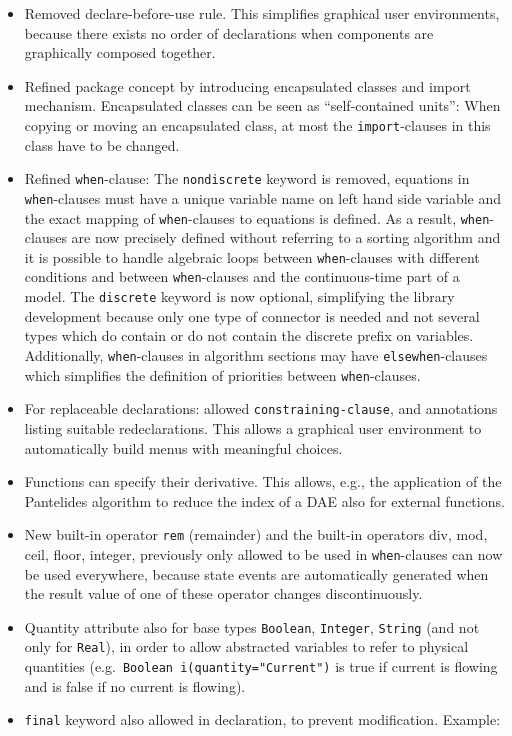\begin{itemize}
\item
  Removed declare-before-use rule. This simplifies graphical user
  environments, because there exists no order of declarations when
  components are graphically composed together.
\item
  Refined package concept by introducing encapsulated classes and import mechanism.
  Encapsulated classes can be seen as ``self-contained units'':
  When copying or moving an encapsulated class, at most the \lstinline!import!-clauses in this class have to be changed.
\item
  Refined \lstinline!when!-clause:
  The \lstinline[morekeywords={[2]{nondiscrete}}]!nondiscrete! keyword is removed, equations in \lstinline!when!-clauses must have a unique variable name on left hand side variable and the exact mapping of \lstinline!when!-clauses to equations is defined.
  As a result, \lstinline!when!-clauses are now precisely defined without referring to a sorting algorithm and it is possible to handle algebraic loops between \lstinline!when!-clauses with different conditions and between \lstinline!when!-clauses and the continuous-time part of a model.
  The \lstinline!discrete! keyword is now optional, simplifying the library development because only one type of connector is needed and not several types which do contain or do not contain the discrete prefix on variables.
  Additionally, \lstinline!when!-clauses in algorithm sections may have \lstinline!elsewhen!-clauses which simplifies the definition of priorities between \lstinline!when!-clauses.
\item
  For replaceable declarations: allowed \lstinline[language=grammar]!constraining-clause!, and annotations listing suitable redeclarations.
  This allows a graphical user environment to automatically build menus with meaningful choices.
\item
  Functions can specify their derivative. This allows, e.g., the
  application of the Pantelides algorithm to reduce the index of a DAE
  also for external functions.
\item
  New built-in operator \lstinline!rem! (remainder) and the built-in operators
  div, mod, ceil, floor, integer, previously only allowed to be used in
  \lstinline!when!-clauses can now be used everywhere, because state events are
  automatically generated when the result value of one of these operator
  changes discontinuously.
\item
  Quantity attribute also for base types \lstinline!Boolean!, \lstinline!Integer!, \lstinline!String! (and not only for \lstinline!Real!), in order to allow abstracted variables to refer to physical quantities (e.g.\ \lstinline!Boolean i(quantity="Current")! is true if current is flowing and is false if no current is flowing).
\item
  \lstinline!final! keyword also allowed in declaration, to prevent modification.
  Example:
\end{itemize}


